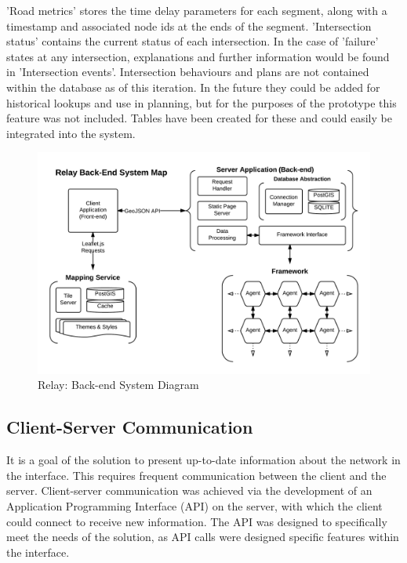 \documentclass{report}
\begin{document}
'Road metrics' stores the time delay parameters for each segment, along with a timestamp and associated node ids at the ends of the segment. 
'Intersection status' contains the current status of each intersection. 
In the case of 'failure' states at any intersection, explanations and further information would be found in 'Intersection events'. 
Intersection behaviours and plans are not contained within the database as of this iteration. 
In the future they could be added for historical lookups and use in planning, but for the purposes of the prototype this feature was not included. 
Tables have been created for these and could easily be integrated into the system.

\begin{figure}[H]
  \begin{centering}
    \includegraphics[scale=0.3,  angle=90]{figures/Relay_Backend_System_Diagram.png}
    \caption{Relay: Back-end System Diagram}
    \label{fig:system-diagram}
  \end{centering}
\end{figure}

\subsection{Client-Server Communication}
It is a goal of the solution to present up-to-date information about the network in the interface. This requires frequent communication between the client and the server. Client-server communication was achieved via the development of an Application Programming Interface (API) on the server, with which the client could connect to receive new information. The API was designed to specifically meet the needs of the solution, as API calls were designed specific features within the interface.
\end{document}
